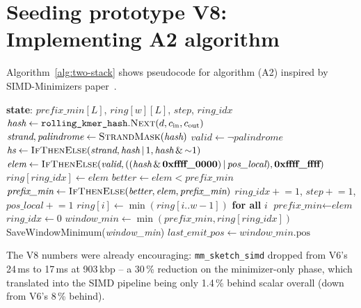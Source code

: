 \section{Seeding prototype V8: Implementing A2 algorithm}
\label{sec:v8-two-stack}

Algorithm~\ref{alg:two-stack} shows pseudocode for algorithm (A2) inspired by SIMD-Minimizers paper~\cite{groot_koerkamp_simd_minimizers_2025}.

\begin{algorithm}[H]
\caption{V8 \texttt{collect\_minimizers\_two\_stack\_simd} (per-step body)}
\label{alg:two-stack}
\small
\begin{algorithmic}[1]
\State \textbf{state}: $\textit{prefix\_min}[L]$, $\textit{ring}[w][L]$, $\textit{step}$, $\textit{ring\_idx}$
\State $\textit{hash} \gets \texttt{rolling\_kmer\_hash}.\textsc{Next}(d, c_\text{in}, c_\text{out})$
\State $\textit{strand}, \textit{palindrome} \gets \textsc{StrandMask}(\textit{hash})$
\State $\textit{valid} \gets \neg\textit{palindrome}$
\State $\textit{hs} \gets \textsc{IfThenElse}(\textit{strand}, \textit{hash}\,|\,1, \textit{hash}\,\&\,{\sim}1)$ 
\State $\textit{elem} \gets \textsc{IfThenElse}(\textit{valid}, ((\textit{hash}\,\&\,\textbf{0xffff\_0000})\,|\,\textit{pos\_local}), \textbf{0xffff\_ffff})$
\State $\textit{ring}[\textit{ring\_idx}] \gets \textit{elem}$ 
\State $\textit{better} \gets \textit{elem} < \textit{prefix\_min}$
\State $\textit{prefix\_min} \gets \textsc{IfThenElse}(\textit{better}, \textit{elem}, \textit{prefix\_min})$
\State $\textit{ring\_idx} \mathrel{+}= 1$, $\textit{step} \mathrel{+}= 1$, $\textit{pos\_local} \mathrel{+}= 1$
                                          
    \State $\textit{ring}[i] \gets \min(\textit{ring}[i..w-1])$ \textbf{for all} $i$ 
    \State $\textit{prefix\_min} \gets \textit{elem}$
    \State $\textit{ring\_idx} \gets 0$
\EndIf
\State $\textit{window\_min} \gets \min(\textit{prefix\_min}, \textit{ring}[\textit{ring\_idx}])$
    \State SaveWindowMinimum(\textit{window\_min})
    \State $\textit{last\_emit\_pos} \gets \textit{window\_min}.\text{pos}$
\EndIf
\end{algorithmic}
\end{algorithm}

The V8 numbers were already encouraging:
\texttt{mm\_sketch\_simd} dropped from V6's 24\,ms to 17\,ms at
903\,kbp -- a 30\,\% reduction on the minimizer-only phase, which
translated into the SIMD pipeline being only 1.4\,\% behind scalar
overall (down from V6's 8\,\% behind).

